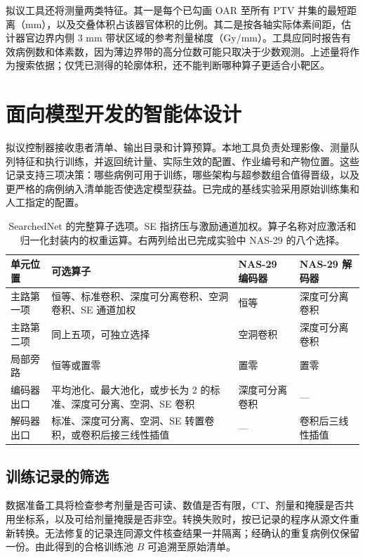 \documentclass[UTF8,letterpaper,twocolumn,11pt,fontset=fandol]{ctexart}
\begin{document}
拟议工具还将测量两类特征。其一是每个已勾画 OAR 至所有 PTV 并集的最短距离（mm），以及交叠体积占该器官体积的比例。其二是按各轴实际体素间距，估计器官边界内侧 3 mm 带状区域的参考剂量梯度（Gy/mm）。工具应同时报告有效病例数和体素数，因为薄边界带的高分位数可能只取决于少数观测。上述量将作为搜索依据；仅凭已测得的轮廓体积，还不能判断哪种算子更适合小靶区。

\section{面向模型开发的智能体设计}
拟议控制器接收患者清单、输出目录和计算预算。本地工具负责处理影像、测量队列特征和执行训练，并返回统计量、实际生效的配置、作业编号和产物位置。这些记录支持三项决策：哪些病例可用于训练，哪些架构与超参数组合值得晋级，以及更严格的病例纳入清单能否使选定模型获益。已完成的基线实验采用原始训练集和人工指定的配置。

\begin{table}[t]
\centering\small
\begin{tabular}{lp{2.65in}ll}
\toprule
单元位置 & 可选算子 & NAS-29 编码器 & NAS-29 解码器\\
\midrule
主路第一项 & 恒等、标准卷积、深度可分离卷积、空洞卷积、SE 通道加权 & 恒等 & 深度可分离卷积\\
主路第二项 & 同上五项，可独立选择 & 空洞卷积 & 深度可分离卷积\\
局部旁路 & 恒等或置零 & 置零 & 置零\\
编码器出口 & 平均池化、最大池化，或步长为 2 的标准、深度可分离、空洞、SE 卷积 & 深度可分离卷积 & ---\\
解码器出口 & 标准、深度可分离、空洞、SE 转置卷积，或卷积后接三线性插值 & --- & 卷积后三线性插值\\
\bottomrule
\end{tabular}
\caption{SearchedNet 的完整算子选项。SE 指挤压与激励通道加权。算子名称对应激活和归一化封装内的权重运算。右两列给出已完成实验中 NAS-29 的八个选择。}
\label{tab:ops}
\end{table}

\subsection{训练记录的筛选}
数据准备工具将检查参考剂量是否可读、数值是否有限，CT、剂量和掩膜是否共用坐标系，以及可给剂量掩膜是否非空。转换失败时，按已记录的程序从源文件重新转换。无法修复的记录连同源文件核查结果一并隔离；经确认的重复病例仅保留一份。由此得到的合格训练池 $B$ 可追溯至原始清单。
\end{document}
